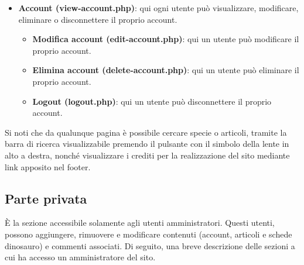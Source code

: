 \documentclass[12pt]{article}
\begin{document}
\begin{itemize}
		\item \textbf{Account (view-account.php)}: qui ogni utente può visualizzare, modificare, eliminare o disconnettere il proprio account.
		\begin{itemize}
			\item \textbf{Modifica account (edit-account.php)}: qui un utente può modificare il proprio account.
		\end{itemize}
		\begin{itemize}
			\item \textbf{Elimina account (delete-account.php)}: qui un utente può eliminare il proprio account.
		\end{itemize}
		\begin{itemize}
			\item \textbf{Logout (logout.php)}: qui un utente può disconnettere il proprio account.
		\end{itemize}
		
	\end{itemize}
	Si noti che da qualunque pagina è possibile cercare specie o articoli, tramite la barra di ricerca visualizzabile premendo il pulsante con il simbolo della lente in alto a destra, nonché visualizzare i crediti per la realizzazione del sito mediante link apposito nel footer.

	\subsection{Parte privata}

	È la sezione accessibile solamente agli utenti amministratori. Questi utenti, possono aggiungere, rimuovere e modificare contenuti (account, articoli e schede dinosauro) e commenti associati.
	Di seguito, una breve descrizione delle sezioni a cui ha accesso un amministratore del sito.
	
\end{document}
